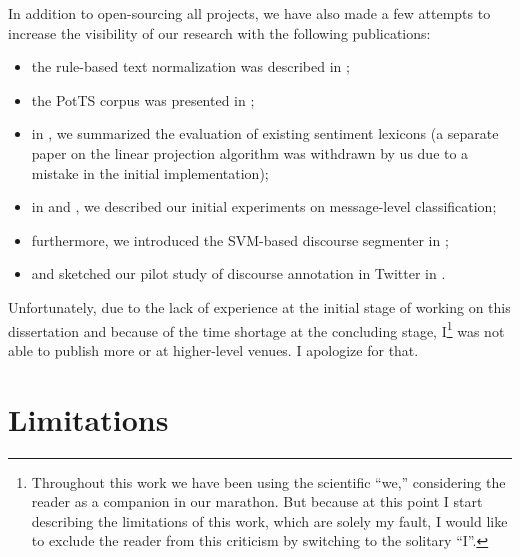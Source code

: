In addition to open-sourcing all projects, we have also made a few
attempts to increase the visibility of our research with the following
publications:
\begin{itemize}
  \item the rule-based text normalization was described in
    \cite{Sidarenka:13};
  \item the PotTS corpus was presented in \cite{Sidarenka:16};
  \item in \cite{Sidarenka:16b}, we summarized the evaluation of
    existing sentiment lexicons (a separate paper on the linear
    projection algorithm was withdrawn by us due to a mistake in the
    initial implementation);
  \item in \cite{Sidarenka:16a} and \cite{Sidarenka:17}, we described
    our initial experiments on message-level classification;
  \item furthermore, we introduced the SVM-based discourse segmenter
    in \cite{Sidarenka:15};
  \item and sketched our pilot study of discourse annotation in
    Twitter in \cite{Sidarenka:15a}.
\end{itemize}
Unfortunately, due to the lack of experience at the initial stage of
working on this dissertation and because of the time shortage at the
concluding stage, I\footnote{Throughout this work we have been using
  the scientific ``we,'' considering the reader as a companion in our
  marathon.  But because at this point I start describing the
  limitations of this work, which are solely my fault, I would like to
  exclude the reader from this criticism by switching to the solitary
  ``I''.} was not able to publish more or at higher-level venues.  I
apologize for that.


\section*{Limitations}

